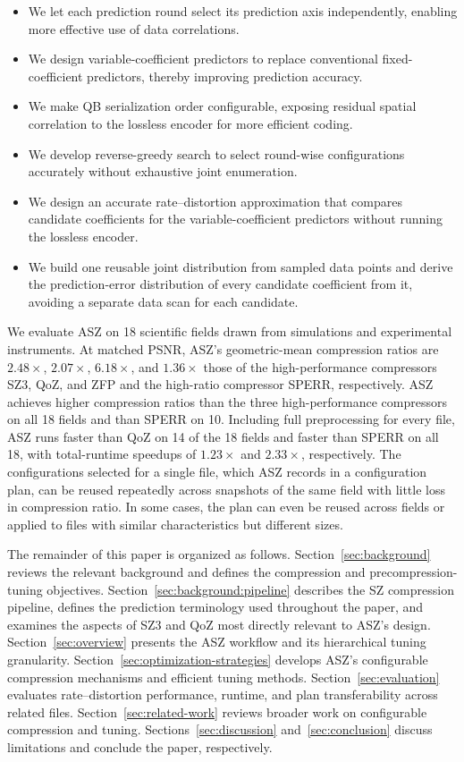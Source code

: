 \begin{itemize}
\item We let each prediction round select its prediction axis independently, enabling more effective use of data correlations.
\item We design variable-coefficient predictors to replace conventional fixed-coefficient predictors, thereby improving prediction accuracy.
\item We make QB serialization order configurable, exposing residual spatial correlation to the lossless encoder for more efficient coding.
\item We develop reverse-greedy search to select round-wise configurations accurately without exhaustive joint enumeration.
\item We design an accurate rate--distortion approximation that compares candidate coefficients for the variable-coefficient predictors without running the lossless encoder.
\item We build one reusable joint distribution from sampled data points and derive the prediction-error distribution of every candidate coefficient from it, avoiding a separate data scan for each candidate.
\end{itemize}

We evaluate ASZ on 18 scientific fields drawn from simulations and experimental instruments. At matched PSNR, ASZ's geometric-mean compression ratios are $2.48\times$, $2.07\times$, $6.18\times$, and $1.36\times$ those of the high-performance compressors SZ3, QoZ, and ZFP and the high-ratio compressor SPERR, respectively. ASZ achieves higher compression ratios than the three high-performance compressors on all 18 fields and than SPERR on 10. Including full preprocessing for every file, ASZ runs faster than QoZ on 14 of the 18 fields and faster than SPERR on all 18, with total-runtime speedups of $1.23\times$ and $2.33\times$, respectively. The configurations selected for a single file, which ASZ records in a configuration plan, can be reused repeatedly across snapshots of the same field with little loss in compression ratio. In some cases, the plan can even be reused across fields or applied to files with similar characteristics but different sizes.

The remainder of this paper is organized as follows. Section~\ref{sec:background} reviews the relevant background and defines the compression and precompression-tuning objectives. Section~\ref{sec:background:pipeline} describes the SZ compression pipeline, defines the prediction terminology used throughout the paper, and examines the aspects of SZ3 and QoZ most directly relevant to ASZ's design. Section~\ref{sec:overview} presents the ASZ workflow and its hierarchical tuning granularity. Section~\ref{sec:optimization-strategies} develops ASZ's configurable compression mechanisms and efficient tuning methods. Section~\ref{sec:evaluation} evaluates rate--distortion performance, runtime, and plan transferability across related files. Section~\ref{sec:related-work} reviews broader work on configurable compression and tuning. Sections~\ref{sec:discussion} and~\ref{sec:conclusion} discuss limitations and conclude the paper, respectively.
